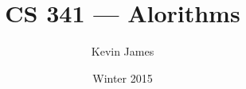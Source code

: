 \documentclass[12pt]{article}
\begin{document}
\title{CS 341 --- Alorithms}
\author{Kevin James}
\date{\vspace{-2ex}Winter 2015}
\maketitle\HRule

\tableofcontents
\newpage

\section{}
\end{document}

